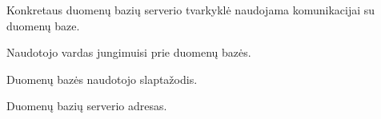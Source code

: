\documentclass[letterpaper,10pt,lithuanian]{sphinxmanual}
\begin{document}
\begin{fulllineitems}
\begin{fulllineitems}
\begin{fulllineitems}

\pysigstartsignatures
{}
\pysigstopsignatures
\end{fulllineitems}



\begin{fulllineitems}

\pysigstartsignatures
{}
\pysigstopsignatures
\end{fulllineitems}


\end{fulllineitems}



\begin{fulllineitems}

\pysigstartsignatures
{}
\pysigstopsignatures
\sphinxAtStartPar
Konkretaus duomenų bazių serverio tvarkyklė naudojama komunikacijai su
duomenų baze.

\end{fulllineitems}



\begin{fulllineitems}

\pysigstartsignatures
{}
\pysigstopsignatures
\sphinxAtStartPar
Naudotojo vardas jungimuisi prie duomenų bazės.

\end{fulllineitems}



\begin{fulllineitems}

\pysigstartsignatures
{}
\pysigstopsignatures
\sphinxAtStartPar
Duomenų bazės naudotojo slaptažodis.

\end{fulllineitems}



\begin{fulllineitems}

\pysigstartsignatures
{}
\pysigstopsignatures
\sphinxAtStartPar
Duomenų bazių serverio adresas.

\end{fulllineitems}



\begin{fulllineitems}


\end{fulllineitems}
\end{fulllineitems}
\end{document}
